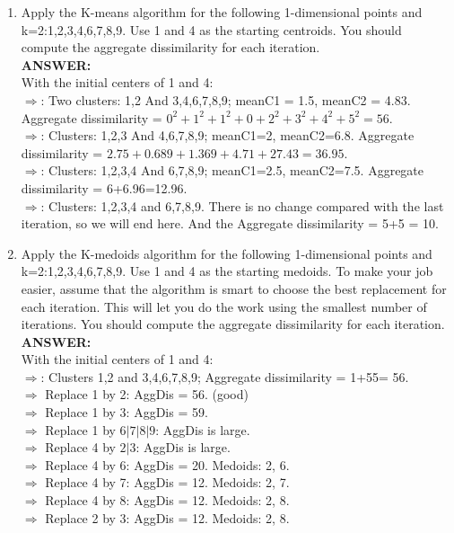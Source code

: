 \documentclass{article}
\begin{document}
\begin{enumerate}
\item Apply the K-means algorithm for the following 1-dimensional
  points and k=2:1,2,3,4,6,7,8,9. Use 1 and 4 as the starting
  centroids. You should compute the aggregate dissimilarity for each
  iteration. \\
\textbf{ANSWER:} \\
With the initial centers of 1 and 4: \\
$\Rightarrow$: Two clusters: {1,2} And {3,4,6,7,8,9}; meanC1 = 1.5,
meanC2 = 4.83. Aggregate dissimilarity =
$0^2+1^2+1^2+0+2^2+3^2+4^2+5^2 = 56$. \\
$\Rightarrow$: Clusters: {1,2,3} And {4,6,7,8,9}; meanC1=2,
meanC2=6.8. Aggregate dissimilarity =
$2.75+0.689+1.369+4.71+27.43=36.95$. \\
$\Rightarrow$: Clusters: {1,2,3,4} And {6,7,8,9}; meanC1=2.5,
meanC2=7.5. Aggregate dissimilarity = 6+6.96=12.96. \\
$\Rightarrow$: Clusters: {1,2,3,4} and {6,7,8,9}. There is no change
compared with the last iteration, so we will end here. And the
Aggregate dissimilarity = 5+5 = 10. 

\item Apply the K-medoids algorithm for the following 1-dimensional
  points and k=2:1,2,3,4,6,7,8,9. Use 1 and 4 as the starting medoids.
  To make your job easier, assume that the algorithm is smart to
  choose the best replacement for each iteration. This will let you do
  the work using the smallest number of iterations. You should compute
  the aggregate dissimilarity for each iteration.\\ 
\textbf{ANSWER:} \\
With the initial centers of 1 and 4: \\
$\Rightarrow$: Clusters {1,2} and {3,4,6,7,8,9}; Aggregate
dissimilarity = 1+55= 56. \\
$\Rightarrow$ Replace 1 by 2: AggDis = 56. (good)\\
$\Rightarrow$ Replace 1 by 3: AggDis = 59. \\
$\Rightarrow$ Replace 1 by $6|7|8|9$: AggDis is large. \\
$\Rightarrow$ Replace 4 by $2|3$: AggDis is large. \\
$\Rightarrow$ Replace 4 by 6: AggDis = 20. Medoids: 2, 6.\\
$\Rightarrow$ Replace 4 by 7: AggDis = 12. Medoids: 2, 7.\\
$\Rightarrow$ Replace 4 by 8: AggDis = 12. Medoids: 2, 8.\\
$\Rightarrow$ Replace 2 by 3: AggDis = 12. Medoids: 2, 8.\\


\end{enumerate}
\end{document}
